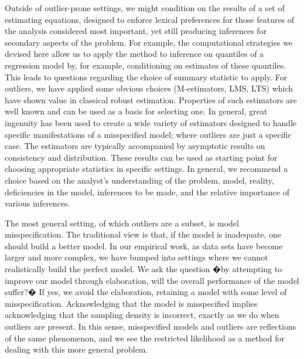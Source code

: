 \documentclass[ba]{imsart}
\begin{document}
Outside of outlier-prone settings, we might condition on the results of a set of estimating equations, designed to enforce lexical preferences for those features of the analysis considered most important, yet still producing inferences for secondary aspects of the problem. For example, the computational strategies we devised here allow us to apply the method to inference on quantiles of a regression model by, for example, conditioning on estimates of these quantiles. This leads to questions regarding the choice of summary statistic to apply. For outliers, we have applied some obvious choices (M-estimators, LMS, LTS) which have shown value in classical robust estimation. Properties of such estimators are well known and can be used as a basis for selecting one. In general, great ingenuity has been used to create a wide variety of estimators designed to handle specific manifestations of a misspecified model; where outliers are just a specific case.  The estimators are typically accompanied by asymptotic results on consistency and distribution.  These results can be used as starting point for choosing appropriate statistics in specific settings. In general, we recommend a choice based on the analyst's understanding of the problem, model, reality, deficiencies in the model,  inferences to be made, and the relative importance of various inferences.  %

 
The most general setting, of which outliers are a subset, is model misspecification. The traditional view is that, if the model is inadequate, one should build a better model. In our empirical work, as data sets have become larger and more complex, we have bumped into settings where we cannot realistically build the perfect model. We ask the question �by attempting to improve our model through elaboration, will the overall performance of the model suffer?� If yes, we avoid the elaboration, retaining a model with some level of misspecification. Acknowledging that the model is misspecified implies acknowledging that the sampling density is incorrect, exactly as we do when outliers are present. In this sense, misspecified models and outliers are reflections of the same phenomenon, and we see the restricted likelihood as a method for dealing with this more general problem. 
\end{document}
